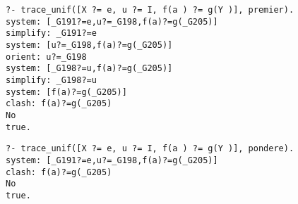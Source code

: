\documentclass[10pt,a4paper]{report}
\begin{document}
\begin{lstlisting}[caption ={Exemple d'execution avec choix aléatoire}]
?- trace_unif([X ?= e, u ?= I, f(a ) ?= g(Y )], premier).
system: [_G191?=e,u?=_G198,f(a)?=g(_G205)]
simplify: _G191?=e
system: [u?=_G198,f(a)?=g(_G205)]
orient: u?=_G198
system: [_G198?=u,f(a)?=g(_G205)]
simplify: _G198?=u
system: [f(a)?=g(_G205)]
clash: f(a)?=g(_G205)
No
true.
\end{lstlisting}

\begin{lstlisting}[caption ={Exemple d'execution avec choix aléatoire}]
?- trace_unif([X ?= e, u ?= I, f(a ) ?= g(Y )], pondere).
system: [_G191?=e,u?=_G198,f(a)?=g(_G205)]
clash: f(a)?=g(_G205)
No
true.
\end{lstlisting}
\end{document}
